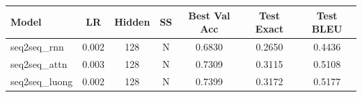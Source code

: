 \begin{tabular}{lcccccc}
\toprule
Model & LR & Hidden & SS & Best Val Acc & Test Exact & Test BLEU \\
\midrule
seq2seq_rnn & 0.002 & 128 & N & 0.6830 & 0.2650 & 0.4436 \\
seq2seq_attn & 0.003 & 128 & N & 0.7309 & 0.3115 & 0.5108 \\
seq2seq_luong & 0.002 & 128 & N & 0.7399 & 0.3172 & 0.5177 \\
\bottomrule
\end{tabular}
